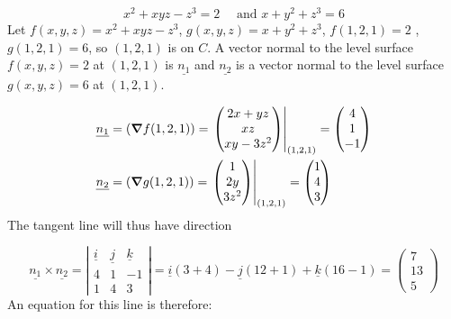 \documentclass{article}
\newcommand{\n}{\leavevmode \newline} %
\newcommand{\xy}{$(x,y)\,$} %
\numberwithin{equation}{subsection} %
\begin{document}
\begin{equation}
    x^2+xyz-z^3=2 \quad \text{ and } x+y^2+z^3=6
\end{equation}
\n
Let $f(x,y,z)=x^2+xyz-z^3$, $g(x,y,z)=x+y^2+z^3$, $f(1,2,1)=2$ , $g(1,2,1)=6$, so $(1,2,1)$ is on $C$. A vector normal to the level surface $f(x,y,z)=2$ at $(1,2,1)$ is $\underline{n_1}$ and $\underline{n_2}$ is a vector normal to the level surface $g(x,y,z)=6$ at $(1,2,1)$.

\begin{equation}
    \begin{split}
        &\underline{n_1}=(\grad f(1,2,1)) =
        \left.
        \begin{pmatrix}
            2x+yz\\xz\\xy-3z^2
        \end{pmatrix}
        \right|_{(1,2,1)}
        =
        \begin{pmatrix}
            4\\1\\-1
        \end{pmatrix}
        \\
        &\underline{n_2}=(\grad g(1,2,1)) =
        \left.
        \begin{pmatrix}
            1\\2y\\3z^2
        \end{pmatrix}
        \right|_{(1,2,1)}
        =
        \begin{pmatrix}
            1\\4\\3
        \end{pmatrix}
    \end{split}
\end{equation}
\n
The tangent line will thus have direction

\begin{equation}
    \underline{n_1} \times \underline{n_2} =
    \left|
    \begin{matrix}
    \underline{i} & \underline{j} & \underline{k}\\
    4 & 1 & -1\\
    1 & 4 & 3
    \end{matrix}
    \right|
    =
    \underline{i}(3+4) - \underline{j}(12+1) + \underline{k}(16-1)
    =
    \begin{pmatrix}
    7\\13\\5
    \end{pmatrix}
\end{equation}
\n
An equation for this line is therefore:
\end{document}
